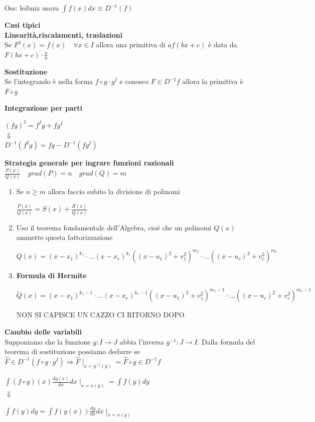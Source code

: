 \documentclass[12pt, a4paper]{article}
\begin{document}
    Oss: leibniz usava $\int f(x)dx\equiv D^{-1}(f)$

    \textbf{Casi tipici\\Linearità,riscalamenti, traslazioni}\\Se $F^{I}(x)=f(x)\quad\forall x\in I$ allora una
    primitiva di $af(bx+c)$ è data da $F(bx+c)\cdot\frac{a}{b}$

    \textbf{Sostituzione}\\Se l'integrando è nella forma $f\circ g\cdot g^{I}$ e  conosco $F\in D^{-1}f$ allora
    la primitiva è $F\circ g$

    \textbf{Integrazione per parti}
    \begin{center}
        $(fg)^{I}=f^{I}g+fg^{I}$\\
        $\Downarrow$\\
        $D^{-1}(f^{I}g)=fg-D^{-1}(fg^{I})$
    \end{center}

    \textbf{Strategia generale per ingrare funzioni razionali}\\$\frac{P(x)}{Q(x)}\quad grad(P)=n\quad grad(Q)=m$
\begin{enumerate}
    \item Se $n\geq m$ allora faccio subito la divisione di polinomi \begin{center}
              $\frac{P(x)}{Q(x)}=S(x)+\frac{R(x)}{Q(x)}$
          \end{center}
    \item Uso il teorema fondamentale dell'Algebra, cioé che un polinomi $Q(x)$ ammette questa fattorizzazione
          \begin{center}
              $Q(x)=(x-x_{1})^{k_{1}}\cdot ... (x-x_{r})^{k_{r}}((x-u_{1})^{2}+v_{1}^{2})^{m_{1}}\cdot ...
                  ((x-u_{c})^{2}+v_{c}^{2})^{m_{c}}$
          \end{center}
    \item \textbf{Formula di Hermite}\begin{center}
              $\tilde{Q}(x)=(x-x_{1})^{k_{1}-1}\cdot ... (x-x_{r})^{k_{r}-1}((x-u_{1})^{2}+v_{1}^{2})^{m_{1}-1}\cdot ...
                  ((x-u_{c})^{2}+v_{c}^{2})^{m_{c}-1}$
          \end{center}
          NON SI CAPISCE UN CAZZO CI RITORNO DOPO
\end{enumerate}

\textbf{Cambio delle variabili}\\Supponiamo che la funzione $g:I\to J$ abbia l'inversa $g^{-1}:J\to I$.
Dalla formula del teorema di sostituzione possiamo dedurre se $\hat{F}\in D^{-1}(f\circ g\cdot g^{I})\Rightarrow
    \hat{F}\mid_{x=g^{-1}(y)}=\hat{F}\circ g\in D^{-1}f$
\begin{center}
    $\int(f\circ y)(x)\frac{dy(x)}{dx}dx\mid_{x=x(y)}=\int f(y)dy$\\
    $\Downarrow$

    $\int f(y)dy=\int f(y(x))\frac{dy}{dx}dx\mid_{x=x(y)}$
\end{center}
\end{document}

